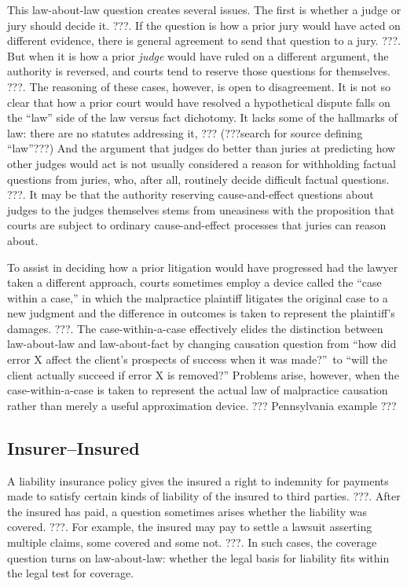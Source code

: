 \documentclass[
  12pt,
  letterpaper,
]{scrartcl}
\begin{document}
This law-about-law question creates several issues. The first is whether a
judge or jury should decide it. ???. If the question is how a prior jury would
have acted on different evidence, there is general agreement to send that
question to a jury. ???. But when it is how a prior \emph{judge} would have
ruled on a different argument, the authority is reversed, and courts tend to
reserve those questions for themselves. ???. The reasoning of these cases, however,
is open to disagreement. It is not so clear that how a prior court would have
resolved a hypothetical dispute falls on the ``law'' side of the law
versus fact dichotomy. It lacks some of the hallmarks of law: there are no
statutes addressing it, ??? (???search for source defining ``law''???) And the
argument that judges do better than juries at predicting how other judges
would act is not usually considered a reason for withholding factual questions
from juries, who, after all, routinely decide difficult factual questions. ???.
It may be that the authority reserving cause-and-effect questions about judges
to the judges themselves stems from uneasiness with the proposition that courts
are subject to ordinary cause-and-effect processes that juries can reason about.

To assist in deciding how a prior litigation would have progressed had the
lawyer taken a different approach, courts sometimes employ a device called the
``case within a case,'' in which the malpractice plaintiff litigates the
original case to a new judgment and the difference in outcomes is taken to
represent the plaintiff's damages. ???. The case-within-a-case effectively
elides the distinction between law-about-law and law-about-fact by changing
causation question from ``how did error X affect the client's prospects of
success when it was made?''~to ``will the client actually succeed if error X is
removed?'' Problems arise, however, when the case-within-a-case is taken to
represent the actual law of malpractice causation rather than merely a useful
approximation device. ??? Pennsylvania example ???


\subsection{Insurer--Insured}

A liability insurance policy gives the insured a right to indemnity for
payments made to satisfy certain kinds of liability of the insured to third
parties. ???. After the insured has paid, a question sometimes arises whether
the liability was covered. ???. For example, the insured may pay to settle a
lawsuit asserting multiple claims, some covered and some not. ???. In such
cases, the coverage question turns on law-about-law: whether the legal basis
for liability fits within the legal test for coverage.
\end{document}
